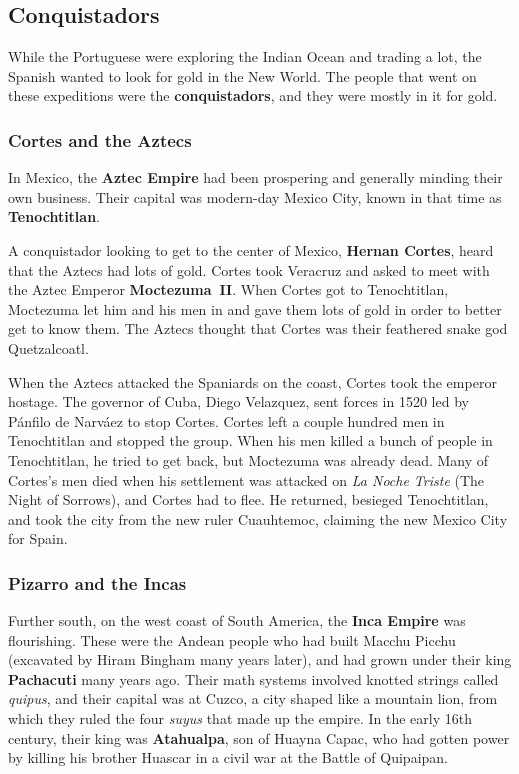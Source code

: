 \subsection*{Conquistadors}

While the Portuguese were exploring the Indian Ocean and trading a lot,
the Spanish wanted to look for gold in the New World.
The people that went on these expeditions were the \textbf{conquistadors},
and they were mostly in it for gold.

\subsubsection*{Cortes and the Aztecs}

In Mexico, the \textbf{Aztec Empire} had been prospering and generally minding their own business.
Their capital was modern-day Mexico City, known in that time as \textbf{Tenochtitlan}.

A conquistador looking to get to the center of Mexico,
\textbf{Hernan Cortes}, heard that the Aztecs had lots of gold.
Cortes took Veracruz and asked to meet with the Aztec Emperor \textbf{Moctezuma~II}.
When Cortes got to Tenochtitlan,
Moctezuma let him and his men in and gave them lots of gold in order to better get to know them.
The Aztecs thought that Cortes was their feathered snake god Quetzalcoatl.

When the Aztecs attacked the Spaniards on the coast, Cortes took the emperor hostage.
The governor of Cuba, Diego Velazquez, sent forces in 1520 led by P\'anfilo de Narv\'aez to stop Cortes.
Cortes left a couple hundred men in Tenochtitlan and stopped the group.
When his men killed a bunch of people in Tenochtitlan, he tried to get back, but Moctezuma was already dead.
Many of Cortes's men died when his settlement was attacked on \textit{La Noche Triste} (The Night of Sorrows),
and Cortes had to flee.
He returned, besieged Tenochtitlan, and took the city from the new ruler Cuauhtemoc,
claiming the new Mexico City for Spain.

\subsubsection*{Pizarro and the Incas}

Further south, on the west coast of South America, the \textbf{Inca Empire} was flourishing.
These were the Andean people who had built Macchu Picchu (excavated by Hiram Bingham many years later),
and had grown under their king \textbf{Pachacuti} many years ago.
Their math systems involved knotted strings called \textit{quipus},
and their capital was at Cuzco, a city shaped like a mountain lion,
from which they ruled the four \textit{suyus} that made up the empire.
In the early 16th century, their king was \textbf{Atahualpa}, son of Huayna Capac,
who had gotten power by killing his brother Huascar in a civil war at the Battle of Quipaipan.

